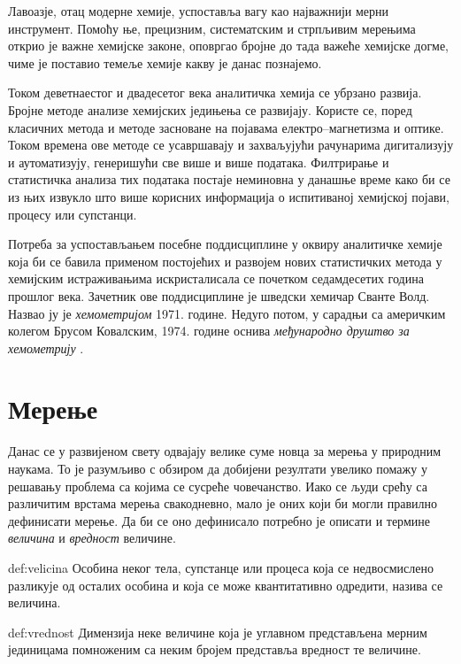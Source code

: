 Лавоазје, отац модерне хемије, успоставља вагу као најважнији мерни
инструмент. Помоћу ње, прецизним, систематским и стрпљивим мерењима
открио је важне хемијске законе, оповргао бројне до тада важеће
хемијске догме, чиме је поставио темеље хемије какву је данас
познајемо.

Током деветнаестог и двадесетог века аналитичка хемија се убрзано
развија. Бројне методе анализе хемијских једињења се развијају.
Користе се, поред класичних метода и методе засноване на појавама
електро--магнетизма и оптике. Током времена ове методе се усавршавају
и захваљујући рачунарима дигитализују и аутоматизују, генеришући
све више и више података. Филтрирање и статистичка анализа тих
података постаје неминовна у данашње време како би се из њих извукло
што више корисних информација о испитиваној хемијској појави, процесу
или супстанци.

Потреба за успостављањем посебне поддисциплине у оквиру аналитичке
хемије која би се бавила применом постојећих и развојем нових статистичких
метода у хемијским истраживањима искристалисала се почетком седамдесетих
година прошлог века. Зачетник ове поддисциплине је шведски хемичар
Сванте Волд. Назвао ју је \emph{хемометријом} 1971. године. Недуго потом,
у сарадњи са америчким колегом Брусом Ковалским, 1974. године оснива
\emph{међународно друштво за хемометрију\/} \cite{Brer14}.  


\section{Мерење}

Данас се у развијеном свету одвајају велике суме новца за мерења
у природним наукама. То је разумљиво с обзиром да добијени резултати
увелико помажу у решавању проблема са којима се сусреће човечанство.
Иако се људи срећу са различитим врстама мерења свакодневно, мало
је оних који би могли правилно дефинисати мерење. Да би се оно
дефинисало потребно је описати и термине \emph{величина} и
\emph{вредност} величине.

\begin{df}[Величина]{def:velicina}
  Особина неког тела, супстанце или процеса која се недвосмислено
  разликује од осталих особина и која се може квантитативно одредити,
  назива се величина.
\end{df}

\begin{df}[Вредност]{def:vrednost}
  Димензија неке величине која је углавном представљена мерним јединицама
  помноженим са неким бројем представља вредност те величине.
\end{df}

